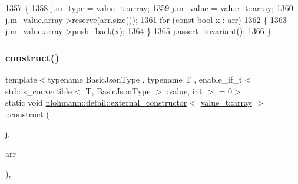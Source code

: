 \begin{DoxyCode}
1357     \{
1358         j.m\_type = \hyperlink{namespacenlohmann_1_1detail_a1ed8fc6239da25abcaf681d30ace4985af1f713c9e000f5d3f280adbd124df4f5}{value\_t::array};
1359         j.m\_value = \hyperlink{namespacenlohmann_1_1detail_a1ed8fc6239da25abcaf681d30ace4985af1f713c9e000f5d3f280adbd124df4f5}{value\_t::array};
1360         j.m\_value.array->reserve(arr.size());
1361         \textcolor{keywordflow}{for} (\textcolor{keyword}{const} \textcolor{keywordtype}{bool} x : arr)
1362         \{
1363             j.m\_value.array->push\_back(x);
1364         \}
1365         j.assert\_invariant();
1366     \}
\end{DoxyCode}
\mbox{\label{structnlohmann_1_1detail_1_1external__constructor_3_01value__t_1_1array_01_4_a1b9226304e6492141080b4ebf228ddac}} 
\subsubsection{\texorpdfstring{construct()}{construct()}\hspace{0.1cm}{\footnotesize\ttfamily [5/5]}}
{\footnotesize\ttfamily template$<$typename Basic\+Json\+Type , typename T , enable\+\_\+if\+\_\+t$<$ std\+::is\+\_\+convertible$<$ T, Basic\+Json\+Type $>$\+::value, int $>$  = 0$>$ \\
static void \hyperlink{structnlohmann_1_1detail_1_1external__constructor}{nlohmann\+::detail\+::external\+\_\+constructor}$<$ \hyperlink{namespacenlohmann_1_1detail_a1ed8fc6239da25abcaf681d30ace4985af1f713c9e000f5d3f280adbd124df4f5}{value\+\_\+t\+::array} $>$\+::construct (\begin{DoxyParamCaption}\item[{Basic\+Json\+Type \&}]{j,  }\item[{const std\+::valarray$<$ T $>$ \&}]{arr }\end{DoxyParamCaption})\hspace{0.3cm}{\ttfamily [inline]}, {\ttfamily [static]}}



